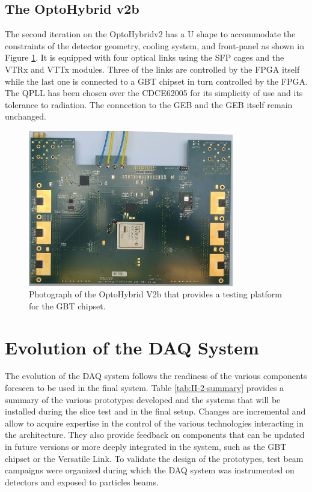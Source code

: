     \subsection{The OptoHybrid v2b}

      The second iteration on the OptoHybridv2 has a U shape to accommodate the constraints of the detector geometry, cooling system, and front-panel as shown in Figure \ref{fig:II-2-ohv2b}. It is equipped with four optical links using the SFP cages and the VTRx and VTTx modules. Three of the links are controlled by the FPGA itself while the last one is connected to a GBT chipset in turn controlled by the FPGA. The QPLL has been chosen over the CDCE62005 for its simplicity of use and its tolerance to radiation. The connection to the GEB and the GEB itself remain unchanged.

      \begin{figure}[h!]
        \centering
        \includegraphics[width=0.8\textwidth]{img/II-2-daq/oh-v2b.jpg}
        \caption{Photograph of the OptoHybrid V2b that provides a testing platform for the GBT chipset.}
        \label{fig:II-2-ohv2b}
      \end{figure}

  \section{Evolution of the DAQ System}

    The evolution of the DAQ system follows the readiness of the various components foreseen to be used in the final system. Table \ref{tab:II-2-summary} provides a summary of the various prototypes developed and the systems that will be installed during the slice test and in the final setup. Changes are incremental and allow to acquire expertise in the control of the various technologies interacting in the architecture. They also provide feedback on components that can be updated in future versions or more deeply integrated in the system, such as the GBT chipset or the Versatile Link. To validate the design of the prototypes, test beam campaigns were organized during which the DAQ system was instrumented on detectors and exposed to particles beams.

